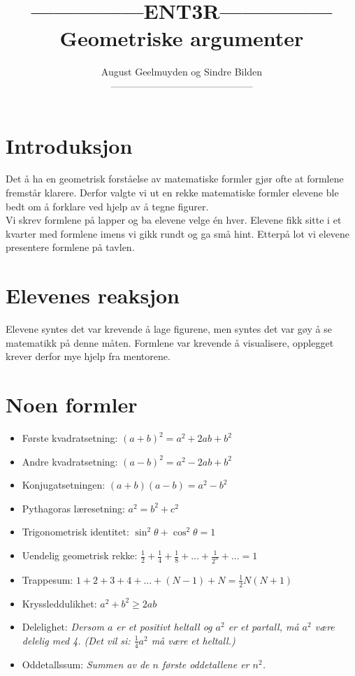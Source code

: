 \documentclass[a4paper, norsk, 12pt]{article}
\title{ 
\Huge ---------------ENT3R--------------- \\ \large Geometriske argumenter}
\author{ August Geelmuyden og Sindre Bilden \\
\huge --------------------------------------------
}
\date{}
\begin{document}
  \maketitle

\section*{Introduksjon}
Det å ha en geometrisk forståelse av matematiske formler gjør ofte at formlene fremstår klarere. Derfor valgte vi ut en rekke matematiske formler elevene ble bedt om å forklare ved hjelp av å tegne figurer.\\[0.5cm]
Vi skrev formlene på lapper og ba elevene velge én hver. Elevene fikk sitte i et kvarter med formlene imens vi gikk rundt og ga små hint. Etterpå lot vi elevene presentere formlene på tavlen. 
 
\section*{Elevenes reaksjon}
Elevene syntes det var krevende å lage figurene, men syntes det var gøy å se matematikk på denne måten. Formlene var krevende å visualisere, opplegget krever derfor mye hjelp fra mentorene. \\

\section*{Noen formler}
\begin{itemize}
\item Første kvadratsetning: $(a+b)^2=a^2+2ab+b^2$
\item Andre kvadratsetning: $(a-b)^2=a^2-2ab+b^2$
\item Konjugatsetningen: $(a+b)(a-b)=a^2-b^2$
\item Pythagoras læresetning: $a^2=b^2+c^2$
\item Trigonometrisk identitet: $\sin^2\theta+\cos^2\theta=1$
\item Uendelig geometrisk rekke: $\frac{1}{2}+\frac{1}{4}+\frac{1}{8}+...+\frac{1}{2^n}+...=1$
\item Trappesum: $1+2+3+4+...+(N-1)+N=\frac{1}{2}N(N+1)$
\item Kryssleddulikhet: $a^2+b^2\geq 2ab$
\item Delelighet: \textit{Dersom $a$ er et positivt heltall og $a^2$ er et partall, må $a^2$ være delelig med 4. (Det vil si: $\frac{1}{4}a^2$ må være et heltall.)}
\item Oddetallssum: \textit{Summen av de $n$ første oddetallene er $n^2$.}
\end{itemize}
\end{document}
